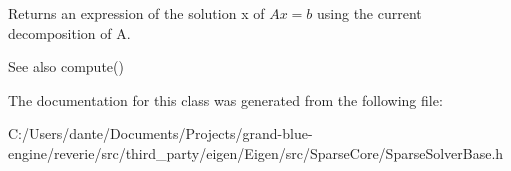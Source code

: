 \begin{DoxyReturn}{Returns}
an expression of the solution x of $ A x = b $ using the current decomposition of A.
\end{DoxyReturn}
\begin{DoxySeeAlso}{See also}
compute() 
\end{DoxySeeAlso}


The documentation for this class was generated from the following file\+:\begin{DoxyCompactItemize}
\item 
C\+:/\+Users/dante/\+Documents/\+Projects/grand-\/blue-\/engine/reverie/src/third\+\_\+party/eigen/\+Eigen/src/\+Sparse\+Core/Sparse\+Solver\+Base.\+h\end{DoxyCompactItemize}

